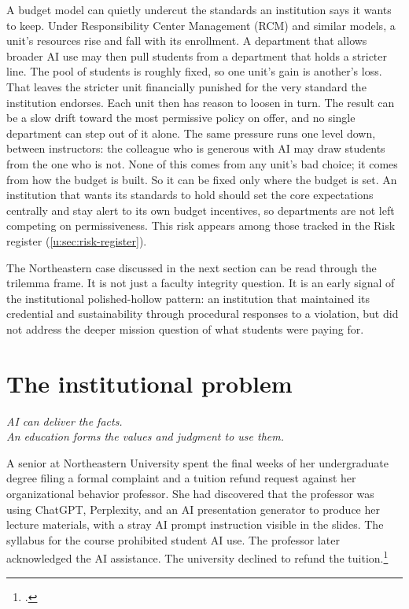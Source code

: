 \documentclass{SIAMbook2023}
\newcommand{\bookepigraph}[1]{%
  \begin{center}%
    \begin{minipage}{0.78\textwidth}%
      \centering\itshape #1%
    \end{minipage}%
  \end{center}%
  \vspace{0.6em}%
}
\begin{document}
A budget model can quietly undercut the standards an institution says it wants to keep. Under Responsibility Center Management (RCM) and similar models, a unit's resources rise and fall with its enrollment. A department that allows broader AI use may then pull students from a department that holds a stricter line. The pool of students is roughly fixed, so one unit's gain is another's loss. That leaves the stricter unit financially punished for the very standard the institution endorses. Each unit then has reason to loosen in turn. The result can be a slow drift toward the most permissive policy on offer, and no single department can step out of it alone. The same pressure runs one level down, between instructors: the colleague who is generous with AI may draw students from the one who is not. None of this comes from any unit's bad choice; it comes from how the budget is built. So it can be fixed only where the budget is set. An institution that wants its standards to hold should set the core expectations centrally and stay alert to its own budget incentives, so departments are not left competing on permissiveness. This risk appears among those tracked in the Risk register (\cref{u:sec:risk-register}).

The Northeastern case discussed in the next section can be read through the trilemma frame. It is not just a faculty integrity question. It is an early signal of the institutional polished-hollow pattern: an institution that maintained its credential and sustainability through procedural responses to a violation, but did not address the deeper mission question of what students were paying for.

\section{The institutional problem}
\label{u:sec:problem}%

\bookepigraph{AI can deliver the facts.\\An education forms the values and judgment to use them.}

A senior at Northeastern University spent the final weeks of her undergraduate degree filing a formal complaint and a tuition refund request against her organizational behavior professor. She had discovered that the professor was using ChatGPT, Perplexity, and an AI presentation generator to produce her lecture materials, with a stray AI prompt instruction visible in the slides. The syllabus for the course prohibited student AI use. The professor later acknowledged the AI assistance. The university declined to refund the tuition.\footnote{\citet{hill2025professors}.}
\end{document}
